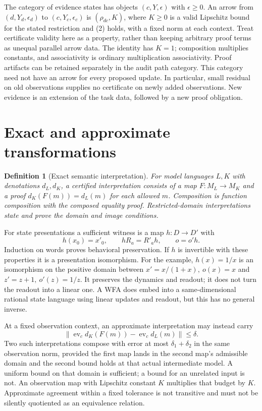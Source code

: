 \documentclass[11pt]{article}
\newtheorem{definition}{Definition}[section]
\newcommand{\norm}[1]{\left\lVert #1\right\rVert}
\newcommand{\ev}{\operatorname{ev}}
\begin{document}
The category of evidence states has objects $(c,Y,\epsilon)$ with
$\epsilon\geq0$. An arrow from $(d,Y_d,\epsilon_d)$ to $(c,Y_c,\epsilon_c)$ is
$(\rho_{dc},K)$, where $K\geq0$ is a valid Lipschitz bound for the
stated restriction and (2) holds, with a fixed norm at each context. Treat certificate
validity here as a property, rather than keeping arbitrary proof terms
as unequal parallel arrow data. The identity has $K=1$; composition
multiplies constants, and associativity is ordinary multiplication
associativity. Proof artifacts can be retained separately in the audit
path category. This category need not have an arrow for every proposed update. In particular,
small residual on old observations supplies no certificate on newly
added observations. New evidence is an extension of the task data,
followed by a new proof obligation.

\section{Exact and approximate transformations}
\label{sec:transport}

\begin{definition}[Exact semantic interpretation]
For model languages $L,K$ with denotations $d_L,d_K$, a certified
interpretation consists of a map $F:M_L\to M_K$ and a proof
$d_K(F(m))=d_L(m)$ for each allowed $m$. Composition is function
composition with the composed equality proof. Restricted-domain
interpretations state and prove the domain and image conditions.
\end{definition}

For state presentations a sufficient witness is a map $h:D\to D'$
with
\[
 h(x_0)=x'_0,\qquad hR_a=R'_a h,\qquad o=o'h.
\]
Induction on words proves behavioral preservation. If $h$ is invertible
with these properties it is a presentation isomorphism. For the example,
$h(x)=1/x$ is an isomorphism on the positive domain between
$x'=x/(1+x),\ o(x)=x$ and $z'=z+1,\ o'(z)=1/z$.
It preserves the dynamics and readout; it does not turn the readout into
a linear one. A WFA does embed into a same-dimensional rational state
language using linear updates and readout, but this has no general inverse.

At a fixed observation context, an approximate interpretation may instead
carry
\[\norm{\ev_c d_K(F(m))-\ev_c d_L(m)}\leq\delta.\]
Two such interpretations compose with error at most
$\delta_1+\delta_2$ in the same observation norm, provided the first
map lands in the second map's admissible domain and the second bound
holds at that actual intermediate model. A uniform bound on that domain
is sufficient; a bound for an unrelated input is not. An observation map with Lipschitz
constant $K$ multiplies that budget by $K$. Approximate agreement within
a fixed tolerance is not transitive and must not be silently quotiented
as an equivalence relation.
\end{document}
